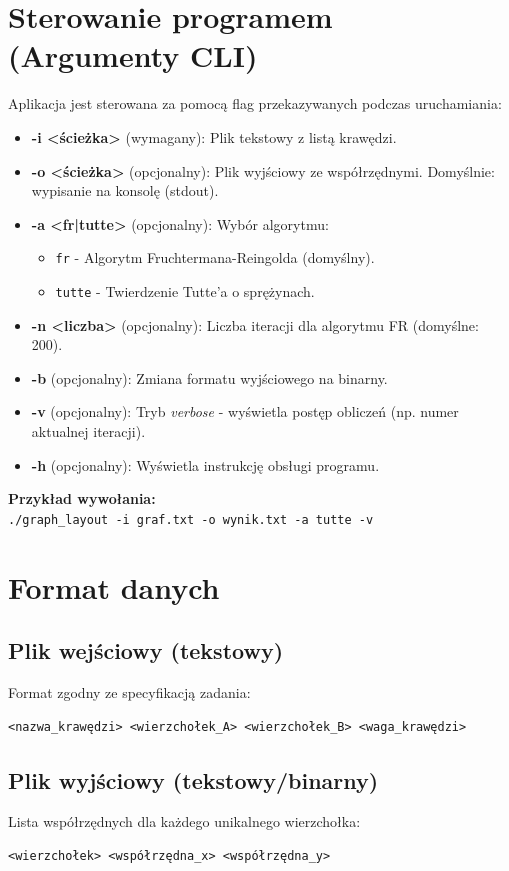 \documentclass[12pt,a4paper]{article}
\begin{document}
\section{Sterowanie programem (Argumenty CLI)}
Aplikacja jest sterowana za pomocą flag przekazywanych podczas uruchamiania:
\begin{itemize}
    \item \textbf{-i <ścieżka>} (wymagany): Plik tekstowy z listą krawędzi.
    \item \textbf{-o <ścieżka>} (opcjonalny): Plik wyjściowy ze współrzędnymi. Domyślnie: wypisanie na konsolę (stdout).
    \item \textbf{-a <fr|tutte>} (opcjonalny): Wybór algorytmu:
        \begin{itemize}
            \item \texttt{fr} - Algorytm Fruchtermana-Reingolda (domyślny).
            \item \texttt{tutte} - Twierdzenie Tutte'a o sprężynach.
        \end{itemize}
    \item \textbf{-n <liczba>} (opcjonalny): Liczba iteracji dla algorytmu FR (domyślne: 200).
    \item \textbf{-b} (opcjonalny): Zmiana formatu wyjściowego na binarny.
    \item \textbf{-v} (opcjonalny): Tryb \textit{verbose} - wyświetla postęp obliczeń (np. numer aktualnej iteracji).
    \item \textbf{-h} (opcjonalny): Wyświetla instrukcję obsługi programu.
\end{itemize}

\vspace{0.5cm}
\noindent \textbf{Przykład wywołania:} \\
\texttt{./graph\_layout -i graf.txt -o wynik.txt -a tutte -v}

\section{Format danych}
\subsection{Plik wejściowy (tekstowy)}
Format zgodny ze specyfikacją zadania:
\begin{verbatim}
<nazwa_krawędzi> <wierzchołek_A> <wierzchołek_B> <waga_krawędzi>
\end{verbatim}

\subsection{Plik wyjściowy (tekstowy/binarny)}
Lista współrzędnych dla każdego unikalnego wierzchołka:
\begin{verbatim}
<wierzchołek> <współrzędna_x> <współrzędna_y>
\end{verbatim}
\end{document}
